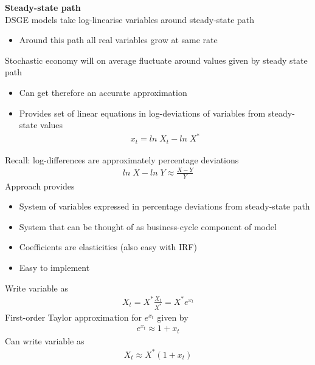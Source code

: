 \documentclass{beamer}
\begin{document}
\begin{frame}
  \textbf{Steady-state path}\\
  DSGE models take log-linearise  variables around steady-state path
  \begin{itemize}
    \item Around this path all real variables grow at same rate
  \end{itemize}
  \medskip
  Stochastic economy will on average fluctuate around values given by steady state path
  \begin{itemize}
    \item Can get therefore an accurate approximation
    \item Provides set of linear equations in log-deviations of variables from steady-state values
    \begin{align*}
      x_t=ln\; X_t - ln\; X^*
    \end{align*}
  \end{itemize}
\end{frame}

\begin{frame}
 Recall: log-differences are approximately percentage deviations
 \begin{align*}
   ln\;X-ln\; Y \approx \frac{X-Y}{Y} 
 \end{align*}
 \medskip
 Approach provides
 \begin{itemize}
   \item System of variables expressed in percentage deviations from steady-state path
   \item System that can be thought of as business-cycle component of model
   \item Coefficients are elasticities (also easy with IRF)
   \item Easy to implement
 \end{itemize}
\end{frame}
\begin{frame}
 Write variable as
 \begin{align}
   X_t=X^*\frac{X_t}{X^*}=X^* e^{x_t} 
 \end{align}
 First-order Taylor approximation for $e^{x_t}$ given by
\begin{align}
  e^{x_t}\approx1+x_t
\end{align}
 Can write variable as
\begin{align}
  X_t \approx X^*(1+x_t)
\end{align}
\end{frame}
\end{document}
